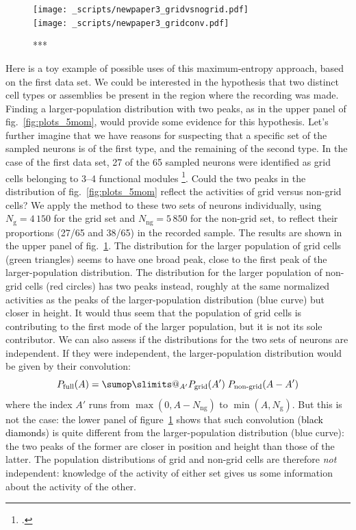 \documentclass[\ifafour a4paper,12pt,\else a5paper,10pt,\fi%
onecolumn,oneside,article,%
british%
]{memoir}
\makeatletter
\theoremstyle{remark}
\theoremstyle{innote}
\def\sum{\DOTSI\sumop\slimits@}
\newcommand*{\citep}{\footcites}
\DeclarePairedDelimiter\set{\{}{\}}
\renewcommand*{\|}{\nonscript\,\vert\nonscript\;\mathopen{}}
\newcommand*{\fig}{fig.}%
\newcommand*{\yAv}{A}
\newcommand*{\yNg}{N_{\text{g}}}
\newcommand*{\yNng}{N_{\text{ng}}}
\newcommand*{\yA}{\yAv}%
\makeatother
\begin{document}
\begin{figure}[!p]
\centering
\texttt{[image: \_scripts/newpaper3\_gridvsnogrid.pdf]}%
\\[3em]%
\texttt{[image: \_scripts/newpaper3\_gridconv.pdf]}%
\caption{***}
\label{fig:plots_cellsubsets}
\end{figure}
Here is a toy example of possible uses of this maximum-entropy approach,
based on the first data set. We could be interested in the hypothesis that
two distinct cell types or assemblies be present in the region where the
recording was made. Finding a larger-population distribution with two
peaks, as in the upper panel of \fig~\ref{fig:plots_5mom}, would provide
some evidence for this hypothesis. Let's further imagine that we have
reasons for suspecting that a specific set of the sampled neurons is of the
first type, and the remaining of the second type. In the case of the first
data set, 27 of the 65 sampled neurons were identified as grid cells
belonging to 3--4 functional modules \citep{dunnetal2015}. Could the
two peaks in the distribution of \fig~\ref{fig:plots_5mom} reflect the
activities of grid versus non-grid cells? We apply the method to these two
sets of neurons individually, using $\yNg=4\,150$ for the grid set and
$\yNng=5\,850$ for the non-grid set, to reflect their proportions (27/65
and 38/65) in the recorded sample. The results are shown in the upper panel
of \fig~\ref{fig:plots_cellsubsets}. The distribution for the larger
population of grid cells (\textcolor{mygreen}{green triangles}) seems to
have one broad peak, close to the first peak of the larger-population
distribution. The distribution for the larger population of non-grid cells
(\textcolor{myred}{red circles}) has two peaks instead, roughly at the same
normalized activities as the peaks of the larger-population distribution
(\textcolor{myblue}{blue curve}) but closer in height. It would thus seem
that the population of grid cells is contributing to the first mode of the
larger population, but it is not its sole contributor. We can also assess
if the distributions for the two sets of neurons are independent. If they
were independent, the larger-population distribution would be given by
their convolution:
\begin{equation}
  \label{eq:convolution}
  P_{\text{full}}(\yA) = \sum_{\yA'} P_{\text{grid}}(\yA')\;
  P_{\text{non-grid}}(\yA-\yA') %
\end{equation}
where the index $\yA'$ runs from $\max(0,\yA-\yNng)$ to $\min(\yA,\yNg)$.
But this is not the case: the lower panel of
figure~\ref{fig:plots_cellsubsets} shows that such convolution
(\textcolor{black}{black diamonds}) is quite different from the
larger-population distribution (\textcolor{myblue}{blue curve}): the two
peaks of the former are closer in position and height than those of the
latter. The population distributions of grid and non-grid cells are
therefore \emph{not} independent: knowledge of the activity of either set
gives us some information about the activity of the other.
\end{document}
